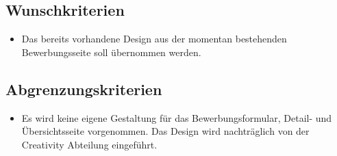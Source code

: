     \subsection{Wunschkriterien}

        \begin{itemize}
            \item Das bereits vorhandene Design aus der momentan bestehenden Bewerbungsseite soll übernommen werden.
        \end{itemize}

    \subsection{Abgrenzungskriterien}

        \begin{itemize}
            \item Es wird keine eigene Gestaltung für das Bewerbungsformular, Detail- und Übersichtsseite vorgenommen. Das Design wird nachträglich von der Creativity Abteilung eingeführt.
        \end{itemize}